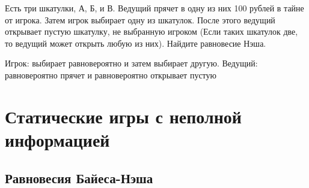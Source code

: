 \begin{problem}

Есть три шкатулки, А, Б, и В. Ведущий прячет в одну из них 100 рублей в тайне от игрока. Затем игрок выбирает одну из шкатулок. После этого ведущий открывает пустую шкатулку, не выбранную игроком (Если таких шкатулок две, то ведущий может открыть любую из них). Найдите равновесие Нэша.



\begin{sol}
Игрок: выбирает равновероятно и затем выбирает другую. Ведущий: равновероятно прячет и равновероятно открывает пустую
\end{sol}
\end{problem}





\section{Статические игры с неполной информацией}

\subsection{Равновесия Байеса-Нэша}


